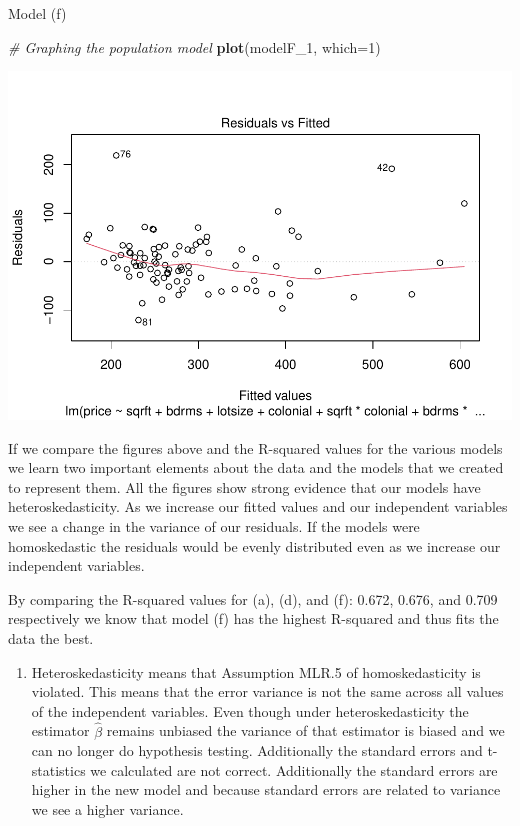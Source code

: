 \documentclass[
  12pt,
  landscape]{article}
\newenvironment{Shaded}{\begin{snugshade}}{\end{snugshade}}
\newcommand{\CommentTok}[1]{\textcolor[rgb]{0.56,0.35,0.01}{\textit{#1}}}
\newcommand{\DataTypeTok}[1]{\textcolor[rgb]{0.13,0.29,0.53}{#1}}
\newcommand{\DecValTok}[1]{\textcolor[rgb]{0.00,0.00,0.81}{#1}}
\newcommand{\KeywordTok}[1]{\textcolor[rgb]{0.13,0.29,0.53}{\textbf{#1}}}
\newcommand{\NormalTok}[1]{#1}
\providecommand{\tightlist}{%
  \setlength{\itemsep}{0pt}\setlength{\parskip}{0pt}}
\begin{document}
Model (f)

\begin{Shaded}
\begin{Highlighting}[]
\CommentTok{# Graphing the population model }
\KeywordTok{plot}\NormalTok{(modelF_}\DecValTok{1}\NormalTok{, }\DataTypeTok{which=}\DecValTok{1}\NormalTok{)}
\end{Highlighting}
\end{Shaded}

\includegraphics{Ogle_MicroMetricsAssignment_2_Q2_files/figure-latex/unnamed-chunk-7-1.pdf}

If we compare the figures above and the R-squared values for the various
models we learn two important elements about the data and the models
that we created to represent them. All the figures show strong evidence
that our models have heteroskedasticity. As we increase our fitted
values and our independent variables we see a change in the variance of
our residuals. If the models were homoskedastic the residuals would be
evenly distributed even as we increase our independent variables.

By comparing the R-squared values for (a), (d), and (f): 0.672, 0.676,
and 0.709 respectively we know that model (f) has the highest R-squared
and thus fits the data the best.

\begin{enumerate}
\def\labelenumi{(\alph{enumi})}
\setcounter{enumi}{7}
\tightlist
\item
  Heteroskedasticity means that Assumption MLR.5 of homoskedasticity is
  violated. This means that the error variance is not the same across
  all values of the independent variables. Even though under
  heteroskedasticity the estimator \(\hat\beta\) remains unbiased the
  variance of that estimator is biased and we can no longer do
  hypothesis testing. Additionally the standard errors and t-statistics
  we calculated are not correct. Additionally the standard errors are
  higher in the new model and because standard errors are related to
  variance we see a higher variance.
\end{enumerate}
\end{document}
